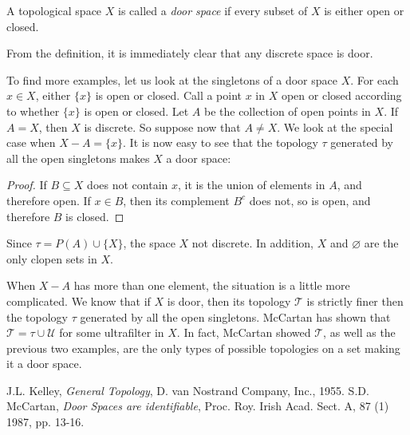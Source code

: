 \documentclass[12pt]{article}
\begin{document}
A topological space $X$ is called a \emph{door space} if every subset of $X$ is either open or closed.

From the definition, it is immediately clear that any discrete space is door.  

To find more examples, let us look at the singletons of a door space $X$.  For each $x\in X$, either $\lbrace x\rbrace$ is open or closed.  Call a point $x$ in $X$ open or closed according to whether $\lbrace x\rbrace$ is open or closed.  Let $A$ be the collection of open points in $X$.  If $A=X$, then $X$ is discrete.  So suppose now that $A\ne X$.  We look at the special case when $X-A=\lbrace x\rbrace$.  It is now easy to see that the topology $\tau$ generated by all the open singletons makes $X$ a door space:
\begin{proof}
If $B\subseteq X$ does not contain $x$, it is the union of elements in $A$, and therefore open.  If $x\in B$, then its complement $B^c$ does not, so is open, and therefore $B$ is closed.
\end{proof}
Since $\tau=P(A)\cup \lbrace X\rbrace$, the space $X$ not discrete.  In addition, $X$ and $\varnothing$ are the only clopen sets in $X$.

When $X-A$ has more than one element, the situation is a little more complicated.  We know that if $X$ is door, then its topology $\mathcal{T}$ is strictly finer then the topology $\tau$ generated by all the open singletons.  McCartan has shown that $\mathcal{T}=\tau \cup \mathcal{U}$ for some ultrafilter in $X$.  In fact, McCartan showed $\mathcal{T}$, as well as the previous two examples, are the only types of possible topologies on a set making it a door space.

\begin{thebibliography}{9}
 J.L. Kelley, \emph{General Topology}, D. van Nostrand Company, Inc., 1955.
 S.D. McCartan, \emph{Door Spaces are identifiable}, Proc. Roy. Irish Acad. Sect. A, 87 (1) 1987, pp. 13-16.
\end{thebibliography}
\end{document}
